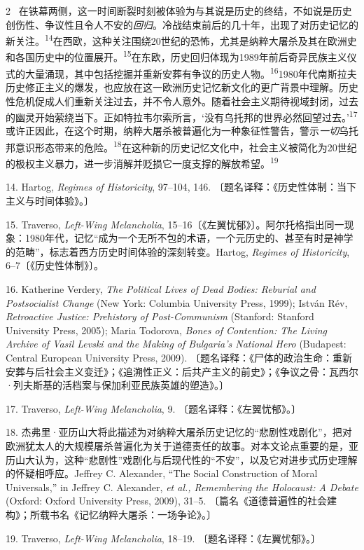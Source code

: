 \documentclass[10pt,a4paper]{article}
\begin{document}
\begin{paracol}{2}
\switchcolumn*
{\scriptsize\color{gray} [p. 6]}\ 在铁幕两侧，这一时间断裂时刻被体验为与其说是历史的终结，不如说是历史创伤性、争议性且令人不安的\textit{回归}。冷战结束前后的几十年，出现了对历史记忆的新关\mbox{注。\textsuperscript{14}}在西欧，这种关注围绕20世纪的恐怖，尤其是纳粹大屠杀及其在欧洲史和各国历史中的位置展\mbox{开。\textsuperscript{15}}在东欧，历史回归体现为1989年前后奇异民族主义仪式的大量涌现，其中包括挖掘并重新安葬有争议的历史人\mbox{物。\textsuperscript{16}}1980年代南斯拉夫历史修正主义的爆发，也应放在这一欧洲历史记忆新文化的更广背景中理解。历史性危机促成人们重新关注过去，并不令人意外。随着社会主义期待视域封闭，过去的幽灵开始萦绕当下。正如特拉韦尔索所言，‘没有乌托邦的世界必然回望过去。’\nobreak\textsuperscript{17}或许正因此，在这个时期，纳粹大屠杀被普遍化为一种象征性警告，警示\textit{一切}乌托邦意识形态带来的危\mbox{险。\textsuperscript{18}}在这种新的历史记忆文化中，社会主义被简化为20世纪的极权主义暴力，进一步消解并贬损它一度支撑的解放希\mbox{望。\textsuperscript{19}}\par{\small 14. Hartog, \textit{Regimes of Historicity}, 97–104, 146. 〔题名译释：《历史性体制：当下主义与时间体验》。〕\par}{\small 15. Traverso, \textit{Left-Wing Melancholia}, 15–16〔《左翼忧郁》〕。阿尔托格指出同一现象：1980年代，记忆“成为一个无所不包的术语，一个元历史的、甚至有时是神学的范畴”，标志着西方历史时间体验的深刻转变。Hartog, \textit{Regimes of Historicity}, 6–7〔《历史性体制》〕。\par}{\small 16. Katherine Verdery, \textit{The Political Lives of Dead Bodies: Reburial and Postsocialist Change} (New York: Columbia University Press, 1999); István Rév, \textit{Retroactive Justice: Prehistory of Post-Communism} (Stanford: Stanford University Press, 2005); Maria Todorova, \textit{Bones of Contention: The Living Archive of Vasil Levski and the Making of Bulgaria’s National Hero} (Budapest: Central European University Press, 2009). 〔题名译释：《尸体的政治生命：重新安葬与后社会主义变迁》；《追溯性正义：后共产主义的前史》；《争议之骨：瓦西尔·列夫斯基的活档案与保加利亚民族英雄的塑造》。〕\par}{\small 17. Traverso, \textit{Left-Wing Melancholia}, 9. 〔题名译释：《左翼忧郁》。〕\par}{\small 18. 杰弗里·亚历山大将此描述为对纳粹大屠杀历史记忆的“悲剧性戏剧化”，把对欧洲犹太人的大规模屠杀普遍化为关于道德责任的故事。对本文论点重要的是，亚历山大认为，这种“悲剧性”戏剧化与后现代性的“不安”，以及它对进步式历史理解的怀疑相呼应。Jeffrey C. Alexander, “The Social Construction of Moral Universals,” in Jeffrey C. Alexander, \textit{et al., Remembering the Holocaust: A Debate} (Oxford: Oxford University Press, 2009), 31–5. 〔篇名《道德普遍性的社会建构》；所载书名《记忆纳粹大屠杀：一场争论》。〕\par}{\small 19. Traverso, \textit{Left-Wing Melancholia}, 18–19. 〔题名译释：《左翼忧郁》。〕\par}

\end{paracol}
\end{document}
